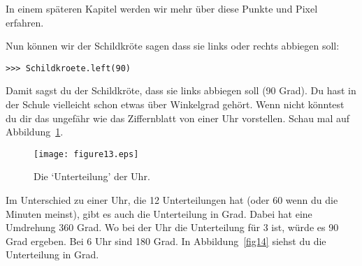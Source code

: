 In einem späteren Kapitel werden wir mehr über diese Punkte und Pixel erfahren.

Nun können wir der Schildkröte sagen dass sie links oder rechts  abbiegen soll:

\begin{Verbatim}[frame=single]
>>> Schildkroete.left(90)
\end{Verbatim}

Damit sagst du der Schildkröte, dass sie links abbiegen soll (90 Grad). Du hast in der Schule vielleicht schon etwas über Winkelgrad gehört. Wenn nicht könntest du dir das ungefähr wie das Ziffernblatt von einer Uhr vorstellen. Schau mal auf Abbildung~\ref{fig13}.

\begin{figure}
\begin{center}
\texttt{[image: figure13.eps]}
\end{center}
\caption{Die `Unterteilung' der Uhr.}\label{fig13}
\end{figure}

Im Unterschied zu einer Uhr, die 12 Unterteilungen hat (oder 60 wenn du die Minuten meinst), gibt es auch die Unterteilung in Grad. Dabei hat eine Umdrehung 360 Grad. Wo bei der Uhr die Unterteilung für 3 ist, würde es 90 Grad ergeben. Bei 6 Uhr sind 180 Grad. In Abbildung~\ref{fig14} siehst du die Unterteilung in Grad.

